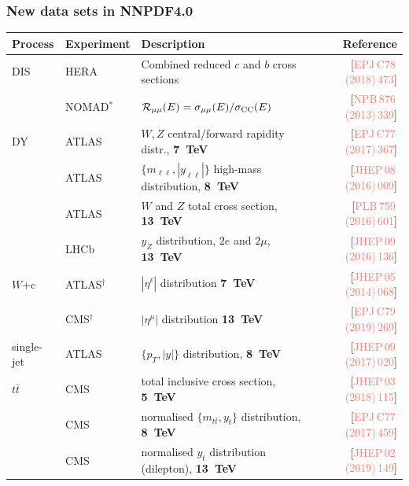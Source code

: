 \documentclass{beamer}
\begin{document}
\begin{frame}
 \frametitle{New data sets in NNPDF4.0}
 \tiny
 \vspace{0.1cm}
 \begin{tabularx}{\textwidth}{llXr}
 \toprule
 Process    & Experiment & Description                                         & Reference\\
 \midrule
 DIS        
            & HERA        & Combined reduced $c$ and $b$ cross sections                      & [{\textcolor{salmon}{EPJ\,C78\,(2018)\,473}}]\\
            & NOMAD$^*$   & $\mathcal{R}_{\mu\mu}(E)=\sigma_{\mu\mu}(E)/\sigma_{\rm CC}(E)$  & [{\textcolor{salmon}{NPB\,876\,(2013)\,339}}]\\
 DY         
            & ATLAS       & $W,Z$ central/forward rapidity distr., {\bf 7~TeV}    & [{\textcolor{salmon}{EPJ\,C77\,(2017)\,367}}]\\
            & ATLAS       & $\{m_{\ell\ell},|y_{\ell\ell}|\}$ high-mass distribution, {\bf 8~TeV} & [{\textcolor{salmon}{JHEP\,08\,(2016)\,009}}]\\
            & ATLAS       & $W$ and $Z$ total cross section, {\bf 13~TeV}                    & [{\textcolor{salmon}{PLB\,759\,(2016)\,601}}]\\
            & LHCb        & $y_Z$ distribution, $2e$ and $2\mu$, {\bf 13~TeV}                & [{\textcolor{salmon}{JHEP\,09\,(2016)\,136}}]\\  
 $W$+c 
            & ATLAS$^\dag$& $|\eta^\ell|$ distribution  {\bf 7~TeV}                          & [{\textcolor{salmon}{JHEP\,05\,(2014)\,068}}]\\
            & CMS$^\dag$  & $|\eta^\mu|$ distribution  {\bf 13~TeV}                          & [{\textcolor{salmon}{EPJ\,C79\,(2019)\,269}}]\\ 
 single-jet 
            & ATLAS       & $\{p_T, |y|\}$ distribution, {\bf 8~TeV}                         & [{\textcolor{salmon}{JHEP\,09\,(2017)\,020}}]\\
 $t\bar{t}$ 
            & CMS         & total inclusive cross section, {\bf 5~TeV}                       & [{\textcolor{salmon}{JHEP\,03\,(2018)\,115}}]\\
            & CMS         & normalised $\{m_{t\bar{t}},y_t\}$ distribution, {\bf 8~TeV}      & [{\textcolor{salmon}{EPJ\,C77\,(2017)\,459}}]\\
            & CMS         & normalised $y_t$ distribution (dilepton), {\bf 13~TeV}           & [{\textcolor{salmon}{JHEP\,02\,(2019)\,149}}]\\

\end{tabularx}
\end{frame}
\end{document}
